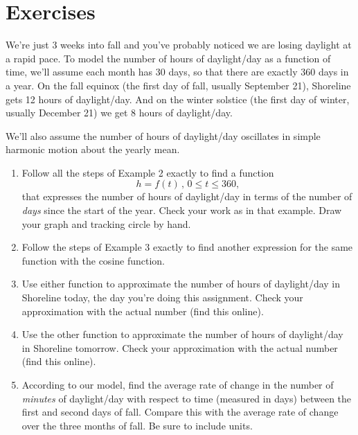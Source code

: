 \documentclass{ximera}
\begin{document}
\section{Exercises}

\begin{exercise} \label{Edfefefe911}
We're just 3 weeks into fall and you've probably noticed we are losing daylight at a rapid pace. To model the number of hours of daylight/day as a function of time, we'll assume each month has 30 days, so that there are exactly $360$ days in a year. On the fall equinox (the first day of fall, usually September 21), Shoreline gets 12 hours of daylight/day. And on the winter solstice (the first day of winter, usually December 21) we get 8 hours of daylight/day. 

We'll also assume the number of hours of daylight/day oscillates in simple harmonic motion about the yearly mean.

\begin{enumerate}
\item Follow all the steps of Example 2 exactly to find a function
\[
  h = f(t) \, , \, 0\leq t \leq 360,
\]
that expresses the number of hours of daylight/day in terms of the number of \emph{days} since the start of the year. Check your work as in that example. Draw your graph and tracking circle by hand.

\item Follow the steps of Example 3 exactly to find another expression for the same function with the cosine function.

\item Use either function to approximate the number of  hours of daylight/day in Shoreline today, the day you're doing this assignment. Check your approximation with the actual number (find this online).

\item Use the other function to approximate the number of  hours of daylight/day in Shoreline tomorrow. Check your approximation with the actual number (find this online). 

\item According to our model, find the average rate of change in the number of \emph{minutes} of daylight/day with respect to time (measured in days) between the first and second days of fall. Compare this with the average rate of change over the three months of fall. Be sure to include units.
\end{enumerate}
\end{exercise}
\end{document}
